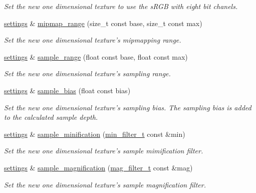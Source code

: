 \begin{DoxyCompactItemize}
\begin{DoxyCompactList}\small\item\em Set the new one dimensional texture to use the s\-R\-G\-B with eight bit chanels. \end{DoxyCompactList}\item 
\hyperlink{classgfx_1_1texture__1D_1_1settings}{settings} \& \hyperlink{classgfx_1_1texture__1D_1_1settings_ab9c1ac7414f0dfa99480e01b80610d41}{mipmap\-\_\-range} (size\-\_\-t const base, size\-\_\-t const max)
\begin{DoxyCompactList}\small\item\em Set the new one dimensional texture's mipmapping range. \end{DoxyCompactList}\item 
\hyperlink{classgfx_1_1texture__1D_1_1settings}{settings} \& \hyperlink{classgfx_1_1texture__1D_1_1settings_a6bab6f79904397206fd75230dd0a00de}{sample\-\_\-range} (float const base, float const max)
\begin{DoxyCompactList}\small\item\em Set the new one dimensional texture's sampling range. \end{DoxyCompactList}\item 
\hyperlink{classgfx_1_1texture__1D_1_1settings}{settings} \& \hyperlink{classgfx_1_1texture__1D_1_1settings_a52528545810efd5dc57d158ce0d671f7}{sample\-\_\-bias} (float const bias)
\begin{DoxyCompactList}\small\item\em Set the new one dimensional texture's sampling bias. The sampling bias is added to the calculated sample depth. \end{DoxyCompactList}\item 
\hyperlink{classgfx_1_1texture__1D_1_1settings}{settings} \& \hyperlink{classgfx_1_1texture__1D_1_1settings_ab87bef6ee23db07731ef1c424ba532ff}{sample\-\_\-minification} (\hyperlink{classgfx_1_1min__filter__t}{min\-\_\-filter\-\_\-t} const \&min)
\begin{DoxyCompactList}\small\item\em Set the new one dimensional texture's sample mimification filter. \end{DoxyCompactList}\item 
\hyperlink{classgfx_1_1texture__1D_1_1settings}{settings} \& \hyperlink{classgfx_1_1texture__1D_1_1settings_ac3834ab2aca9a0118e162ba76446dc4b}{sample\-\_\-magnification} (\hyperlink{classgfx_1_1mag__filter__t}{mag\-\_\-filter\-\_\-t} const \&mag)
\begin{DoxyCompactList}\small\item\em Set the new one dimensional texture's sample magnification filter. \end{DoxyCompactList}\item 

\end{DoxyCompactItemize}
